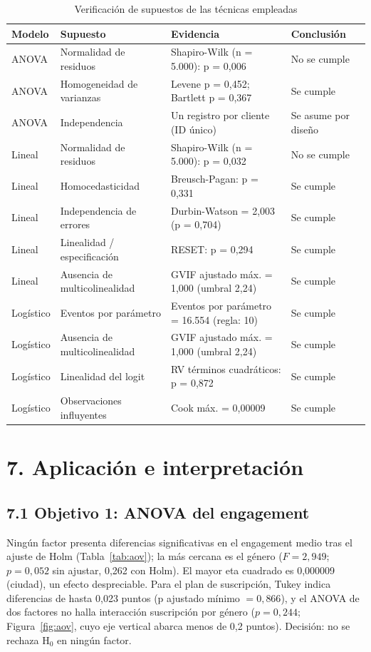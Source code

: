 \documentclass[a4,11pt]{aleph-notas}
\begin{document}
\begin{table}[!htb]\centering\small\linespread{1}\selectfont
\caption{Verificación de supuestos de las técnicas empleadas}\label{tab:sup}
\begin{tabular}{lp{3.3cm}p{5.6cm}l}
\toprule
Modelo & Supuesto & Evidencia & Conclusión \\
\midrule
ANOVA & Normalidad de residuos & Shapiro-Wilk (n = 5.000): p = 0,006 & No se cumple \\
ANOVA & Homogeneidad de varianzas & Levene p = 0,452; Bartlett p = 0,367 & Se cumple \\
ANOVA & Independencia & Un registro por cliente (ID único) & Se asume por diseño \\
Lineal & Normalidad de residuos & Shapiro-Wilk (n = 5.000): p = 0,032 & No se cumple \\
Lineal & Homocedasticidad & Breusch-Pagan: p = 0,331 & Se cumple \\
Lineal & Independencia de errores & Durbin-Watson = 2,003 (p = 0,704) & Se cumple \\
Lineal & Linealidad / especificación & RESET: p = 0,294 & Se cumple \\
Lineal & Ausencia de multicolinealidad & GVIF ajustado máx. = 1,000 (umbral 2,24) & Se cumple \\
Logístico & Eventos por parámetro & Eventos por parámetro = 16.554 (regla: 10) & Se cumple \\
Logístico & Ausencia de multicolinealidad & GVIF ajustado máx. = 1,000 (umbral 2,24) & Se cumple \\
Logístico & Linealidad del logit & RV términos cuadráticos: p = 0,872 & Se cumple \\
Logístico & Observaciones influyentes & Cook máx. = 0,00009 & Se cumple \\
\bottomrule
\end{tabular}
\par{}
\end{table}


\section*{7. Aplicación e interpretación}

\subsection*{7.1 Objetivo 1: ANOVA del engagement}
Ningún factor presenta diferencias significativas en el engagement medio tras el ajuste de Holm (Tabla~\ref{tab:aov}); la más cercana es el género ($F=2{,}949$; $p=0{,}052$ sin ajustar, 0,262 con Holm). El mayor eta cuadrado es 0,000009 (ciudad), un efecto despreciable. Para el plan de suscripción, Tukey indica diferencias de hasta 0,023 puntos (p ajustado mínimo $=0{,}866$), y el ANOVA de dos factores no halla interacción suscripción por género ($p=0{,}244$; Figura~\ref{fig:aov}, cuyo eje vertical abarca menos de 0,2 puntos). Decisión: no se rechaza H$_0$ en ningún factor.
\end{document}
